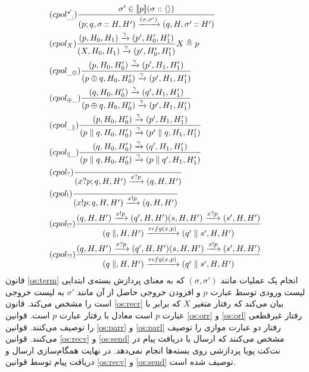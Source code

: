 \begin{align}
     & (cpol^{\checkmark}_{\_;})
    \frac{\sigma' \in \llbracket p \rrbracket(\sigma::\langle  \rangle)}
    {(p;q,\sigma::H,H')\xrightarrow{(\sigma,\sigma')}
    (q,H,\sigma'::H') }    \label{os:term}                                 \\
     & (cpol_X)
    \frac{(p,H_0,H_1)\xrightarrow{\gamma}(p',H_0',H_1')}
    {(X,H_0,H_1)\xrightarrow{\gamma}(p',H_0',H_1')}
    X \triangleq p         \label{os:recr}                                 \\
     & (cpol_{\_\oplus})
    \frac{(p,H_0,H_0')\xrightarrow{\gamma}(p',H_1,H_1')}
    {(p\oplus q,H_0,H_0')\xrightarrow{\gamma}(p',H_1,H_1')}
    \label{os:orr}                                                         \\
     & (cpol_{\oplus\_})
    \frac{(q,H_0,H_0')\xrightarrow{\gamma}(q',H_1,H_1')}
    {(p\oplus q,H_0,H_0')\xrightarrow{\gamma}(p',H_1,H_1')} \label{os:orl} \\
     & (cpol_{\_\parallel})
    \frac{(p,H_0,H_0')\xrightarrow{\gamma}(p',H_1,H_1')}
    {(p\parallel q,H_0,H_0')\xrightarrow{\gamma}(p' \parallel q,H_1,H_1')}
    \label{os:parr}                                                        \\
     & (cpol_{\parallel\_})
    \frac{(q,H_0,H_0')\xrightarrow{\gamma}(q',H_1,H_1')}
    {(p\parallel q,H_0,H_0')\xrightarrow{\gamma}(p \parallel q',H_1,H_1')}
    \label{os:parl}                                                        \\
     & (cpol_?)
    \frac{}
    {(x?p;q,H,H')\xrightarrow{x?p}(q,H,H')}
    \label{os:recv}                                                        \\
     & (cpol_!)
    \frac{}
    {(x!p;q,H,H')\xrightarrow{x!p}(q,H,H')}
    \label{os:send}                                                        \\
     & (cpol_{!?})
    \frac{
        (q,H,H') \xrightarrow{x!p}(q',H,H')
        (s,H,H') \xrightarrow{x?p} (s',H,H')
    }{
        (q\parallel,H,H') \xrightarrow{rcfg(x,p)} (q'\parallel s',H,H')
    }     \label{os:syncr}                                                 \\
     & (cpol_{?!})
    \frac{
        (q,H,H') \xrightarrow{x?p}(q',H,H')
        (s,H,H') \xrightarrow{x!p} (s',H,H')
    }{
        (q\parallel,H,H') \xrightarrow{rcfg(x,p)} (q'\parallel s',H,H')
    } \label{os:syncl}
\end{align}
قانون 
\ref{os:term}
انجام یک عملیات مانند
$(\sigma,\sigma')$
که به معنای
پردازش بسته‌ی ابتدایی لیست ورودی توسط عبارت 
$p$
و افزودن خروجی حاصل از آن مانند 
$\sigma'$
به لیست خروجی است را مشخص می‌کند.
قانون 
\ref{os:recr}
بیان می‌کند که رفتار متغیر 
$X$
که برابر با عبارت 
$p$
است معادل با رفتار عبارت 
$p$
است.
قوانین 
\ref{os:orr}
و
\ref{os:orl}
رفتار غیرقطعی را توصیف می‌کنند.
قوانین
\ref{os:parr}
و
\ref{os:parl}
رفتار دو عبارت موازی را توصیف می‌کنند.
قوانین
\ref{os:recv}
و
\ref{os:send}
مشخص می‌کنند که ارسال یا دریافت پیام در نت‌کت پویا پردازشی روی بسته‌ها انجام نمی‌دهد.
در نهایت همگام‌سازی
ارسال و دریافت پیام توسط قوانین 
\ref{os:recv}
و
\ref{os:send}
توصیف شده است.


